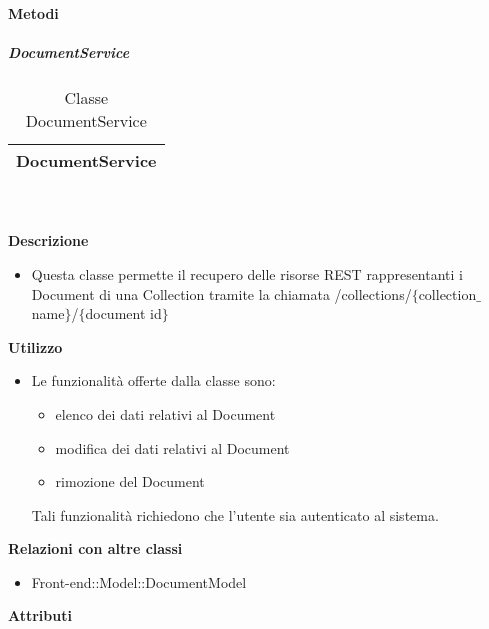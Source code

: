 		\textbf{Metodi} 
	\begin{itemize}
		\end{itemize}
			\subparagraph{DocumentService} 
\begin{table}[ht]
\begin{center}
\bgroup
	\setlength{\arrayrulewidth}{0.6mm}
	\def\arraystretch{1}
		\begin{tabular}{ | p{12cm} | }
				\hline  
					\centerline{\textbf{DocumentService}}
		\\ \hline 
				\hline
				\hline
		
		\end{tabular}
\egroup
\caption{Classe DocumentService}
\end{center}
\end{table}  \textbf{\\ \\ Descrizione} 
					\begin{itemize}
						\item[] Questa classe permette il recupero delle risorse REST rappresentanti i Document di una Collection tramite la chiamata /collections/$\{$collection$\_$name$\}$/$\{$document id$\}$
					\end{itemize}      
				\textbf{Utilizzo}  
					\begin{itemize}
						\item[] Le funzionalità offerte dalla classe sono: 
\begin{itemize} 
\item elenco dei dati relativi al Document 
\item modifica dei dati relativi al Document
\item rimozione del Document 
\end{itemize} 
Tali funzionalità richiedono che l'utente sia autenticato al sistema.
					\end{itemize}
					\textbf{Relazioni con altre classi}
					\begin{itemize}
							\item{Front-end::Model::DocumentModel}
					\end{itemize}
			 \textbf{Attributi} 
	\begin{itemize}
		\end{itemize}
		
